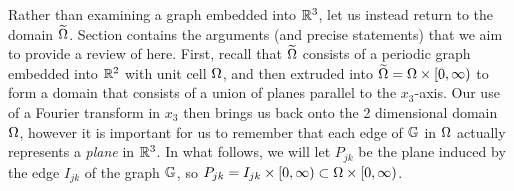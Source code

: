 Rather than examining a graph embedded into $\mathbb{R}^3$, let us instead return to the domain $\widetilde{\Omega}$.
Section  contains the arguments (and precise statements) that we aim to provide a review of here.
First, recall that $\widetilde{\Omega}$ consists of a periodic graph embedded into $\mathbb{R}^2$ with unit cell $\Omega$, and then extruded into $\widetilde{\Omega} = \Omega\times[0,\infty)$ to form a domain that consists of a union of planes parallel to the $x_3$-axis.
Our use of a Fourier transform in $x_3$ then brings us back onto the 2 dimensional domain $\Omega$, however it is important for us to remember that each edge of $\mathbb{G}$ in $\Omega$ actually represents a \emph{plane} in $\mathbb{R}^3$.
In what follows, we will let $P_{jk}$ be the plane induced by the edge $I_{jk}$ of the graph $\mathbb{G}$, so $P_{jk} = I_{jk}\times[0,\infty)\subset\Omega\times[0,\infty)$.

